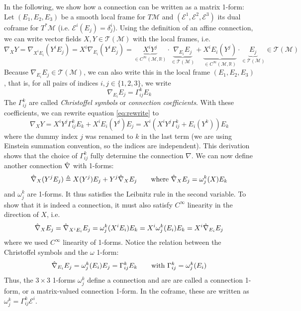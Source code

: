 \documentclass[../thesis.tex]{subfiles}
\begin{document}
In the following, we show how a connection can be written as a matrix 1-form:
Let $(E_1, E_2, E_3)$ be a smooth local frame for $T\mathcal{M}$ and
$(\mathcal{E}^1, \mathcal{E}^2, \mathcal{E}^3)$ its dual coframe for
$T^*\mathcal{M}$ (i.e. $\mathcal{E}^i(E_j)=\delta^i_j$).
Using the definition of an affine connection, we can write
vector fields $X,Y \in \mathcal{T}(\mathcal{M})$ with the local frames, i.e.
\begin{equation}\label{eq:rewrite}
  \nabla_XY = \nabla_{X^iE_i}(Y^iE_j) = X^i\nabla_{E_i}(Y^iE_j)
  = \underbrace{X^iY^j}_{\in C^{\infty}(\mathcal{M}, \mathbb{R})} \cdot \underbrace{\nabla_{E_i}E_j}_{\in \mathcal{T}(\mathcal{M})} + \underbrace{X^iE_i(Y^j)}_{\in C^{\infty}(\mathcal{M}, \mathbb{R})}\cdot \underbrace{E_j}_{\in \mathcal{T}(\mathcal{M})} \in \mathcal{T}(\mathcal{M})
\end{equation}
Because $\nabla_{E_i}E_j \in \mathcal{T}(\mathcal{M})$, we can also write this in the local frame $(E_1, E_2, E_3)$,
that is, for all pairs of indices $i,j \in \{1,2,3\}$, we write
$$\nabla_{E_i}E_j = \Gamma_{ij}^kE_k$$
The $\Gamma_{ij}^k$ are called \emph{Christoffel symbols} or \emph{connection coefficients}.
With these coefficients, we can rewrite equation \ref{eq:rewrite} to 
\begin{equation}
  \nabla_XY = X^iY^j \Gamma_{ij}^kE_k + X^iE_i(Y^j) E_j = X^i(X^iY^j\Gamma_{ij}^k + E_i(Y^k))E_k
\end{equation}
where the dummy index $j$ was renamed to $k$ in the last term (we are using Einstein summation convention, so the indices are independent).
This derivation shows that the choice of $\Gamma_{ij}^k$ fully determine the connection $\nabla$.
We can now define another connection $\Hat{\nabla}$ with 1-forms:
\begin{equation}
  \Hat{\nabla}_X (Y^jE_j) \triangleq X(Y^j)E_j + Y^j \Hat{\nabla}_X E_j \qquad \text{where } \Hat{\nabla}_XE_j = \omega_j^k(X)E_k
\end{equation}
and $\omega_j^k$ are 1-forms. It thus satisfies the Leibnitz rule in the second variable.
To show that it is indeed a connection, it must also satisfy $C^{\infty}$ linearity in the direction of $X$, i.e.
\begin{equation}
  \Hat{\nabla}_XE_j = \Hat{\nabla}_{X^iE_i}E_j = \omega_j^k(X^iE_i)E_k = X^i\omega_j^k(E_i)E_k = X^i \Hat{\nabla}_{E_i}E_j
\end{equation}
where we used $C^{\infty}$ linearity of 1-forms. Notice the relation between
the Christoffel symbols and the $\omega$ 1-form:
$$\Hat{\nabla}_{E_i}E_j = \omega_j^k(E_i)E_j = \Gamma_{ij}^kE_k \qquad \text{with }\Gamma_{ij}^k=\omega_j^k(E_i)$$
Thus, the $3\times3$ 1-forms $\omega_j^k$ define a connection and are
are called a connection 1-form, or a matrix-valued connection 1-form. In the coframe, these are written as $\omega_j^k = \Gamma_{ij}^k \mathcal{E}^i$.
\end{document}
